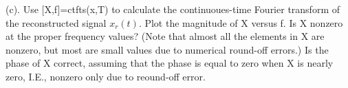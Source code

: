 (c). Use [X,f]=ctfts(x,T) to calculate the continuoues-time Fourier transform of the reconstructed signal $x_r(t)$. Plot the magnitude of X versus f. Is X nonzero at the proper frequency values? (Note that almost all the elements in X are nonzero, but most are small values due to numerical round-off errors.) Is the phase of X correct, assuming that the phase is equal to zero when X is nearly zero, I.E., nonzero only due to reound-off error.

